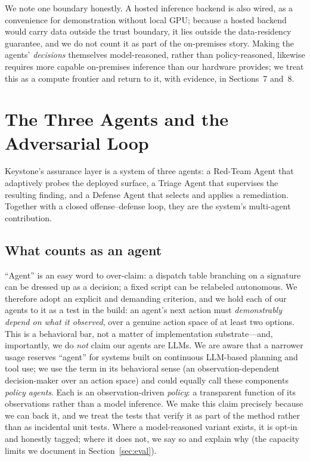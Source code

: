 \documentclass[10pt,twocolumn]{article}
\begin{document}
We note one boundary honestly. A hosted inference backend is also wired, as a
convenience for demonstration without local GPU; because a hosted backend would
carry data outside the trust boundary, it lies outside the data-residency
guarantee, and we do not count it as part of the on-premises story. Making the
agents' \emph{decisions} themselves model-reasoned, rather than
policy-reasoned, likewise requires more capable on-premises inference than our
hardware provides; we treat this as a compute frontier and return to it, with
evidence, in Sections~7 and~8.





\section{The Three Agents and the Adversarial Loop}\label{sec:agents}

Keystone's assurance layer is a system of three agents: a Red-Team Agent that
adaptively probes the deployed surface, a Triage Agent that supervises the
resulting finding, and a Defense Agent that selects and applies a remediation.
Together with a closed offense--defense loop, they are the system's multi-agent
contribution.

\subsection{What counts as an agent}

``Agent'' is an easy word to over-claim: a dispatch table branching on a
signature can be dressed up as a decision; a fixed script can be relabeled
autonomous. We therefore adopt an explicit and demanding criterion,
and we hold each of our agents to it as a test in the build: an agent's next
action must \emph{demonstrably depend on what it observed}, over a genuine action
space of at least two options. This is a behavioral bar, not a matter of
implementation substrate---and, importantly, we do \emph{not} claim our agents
are LLMs. We are aware that a narrower usage reserves ``agent'' for systems
built on continuous LLM-based planning and tool use; we use the term in its
behavioral sense (an observation-dependent decision-maker over an action space)
and could equally call these components \emph{policy agents}. Each is an
observation-driven \emph{policy}: a transparent function of its observations
rather than a model inference. We make this claim precisely
because we can back it, and we treat the tests that verify it as part of the
method rather than as incidental unit tests. Where a model-reasoned variant
exists, it is opt-in and honestly tagged; where it does not, we say so and
explain why (the capacity limits we document in Section~\ref{sec:eval}).
\end{document}
